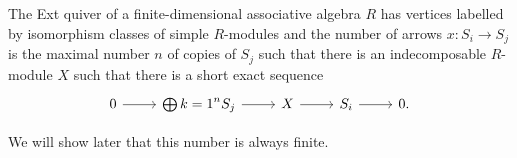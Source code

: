 The Ext quiver of a finite-dimensional associative algebra $R$ has vertices
labelled by isomorphism classes of simple $R$-modules and the number of arrows
$x\colon S_i\to S_j$ is the maximal number $n$ of copies of $S_j$ such that there
is an indecomposable $R$-module $X$ such that there is a short exact sequence
\[\begin{tikzcd}
	0\ar[r] & \bigoplus{k=1}^n S_j\ar[r] & X\ar[r] & S_i\ar[r] & 0.
\end{tikzcd}\]

We will show later that this number is always finite.
